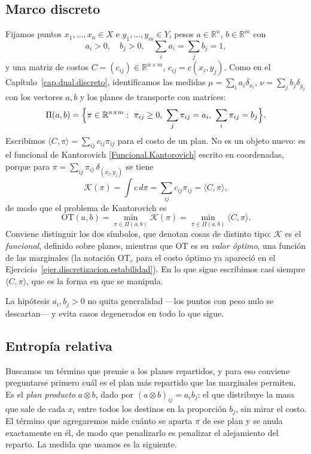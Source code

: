\documentclass[12pt, a4paper]{amsbook}
\newcommand{\R}{{\mathbb R}}
\theoremstyle{remark}
\theoremstyle{definition}
\numberwithin{section}{chapter}
\numberwithin{subsection}{section}
\numberwithin{equation}{section}
\numberwithin{figure}{chapter}
\begin{document}
\subsection*{Marco discreto}

Fijamos puntos $x_1,\dots,x_n\in X$ e $y_1,\dots,y_m\in Y$, pesos
$a\in\R^n$, $b\in\R^m$ con
\[
a_i>0,\quad b_j>0,\quad\sum_ia_i=\sum_jb_j=1,
\]
y una matriz de costos $C=(c_{ij})\in\R^{n\times m}$, $c_{ij}=c(x_i,y_j)$.
Como en el Capítulo~\ref{cap.dual.discreto}, identificamos las medidas
$\mu=\sum_ia_i\delta_{x_i}$, $\nu=\sum_jb_j\delta_{y_j}$ con los vectores $a,b$
y los planes de transporte con matrices:
\[
\Pi(a,b)=\Bigl\{\pi\in\R^{n\times m}:\ \pi_{ij}\ge0,\ \sum_j\pi_{ij}=a_i,\ \sum_i\pi_{ij}=b_j\Bigr\}.
\]
Escribimos $\langle C,\pi\rangle=\sum_{ij}c_{ij}\pi_{ij}$ para el costo de un
plan. No es un objeto nuevo: es el funcional de Kantorovich
\eqref{Funcional.Kantorovich} escrito en coordenadas, porque para
$\pi=\sum_{ij}\pi_{ij}\,\delta_{(x_i,y_j)}$ se tiene
\[
\mathcal K(\pi)=\int c\,d\pi=\sum_{ij}c_{ij}\pi_{ij}=\langle C,\pi\rangle,
\]
de modo que el problema de Kantorovich es
\begin{equation}\label{eq:OT.discreto}
\mathrm{OT}(a,b)=\min_{\pi\in\Pi(a,b)}\mathcal K(\pi)=\min_{\pi\in\Pi(a,b)}\langle C,\pi\rangle.
\end{equation}
Conviene distinguir los dos símbolos, que denotan cosas de distinto tipo:
$\mathcal K$ es el \emph{funcional}, definido sobre planes, mientras que
$\mathrm{OT}$ es su \emph{valor óptimo}, una función de las marginales
(la notación $\mathrm{OT}_c$ para el costo óptimo ya apareció en el
Ejercicio~\ref{ejer.discretizacion.estabilidad}). En lo que sigue escribimos
casi siempre $\langle C,\pi\rangle$, que es la forma en que se manipula.

La hipótesis $a_i,b_j>0$ no quita generalidad —los puntos con peso nulo se
descartan— y evita casos degenerados en todo lo que sigue.

\subsection*{Entropía relativa}

Buscamos un término que premie a los planes repartidos, y para eso conviene
preguntarse primero cuál es el plan más repartido que las marginales
permiten. Es el \emph{plan producto} $a\otimes b$, dado por
$(a\otimes b)_{ij}=a_ib_j$: el que distribuye la masa que sale de cada $x_i$
entre todos los destinos en la proporción $b_j$, sin mirar el costo. El
término que agregaremos mide cuánto se aparta $\pi$ de ese plan y se anula
exactamente en él, de modo que penalizarlo es penalizar el alejamiento del
reparto. La medida que usamos es la siguiente.
\end{document}
